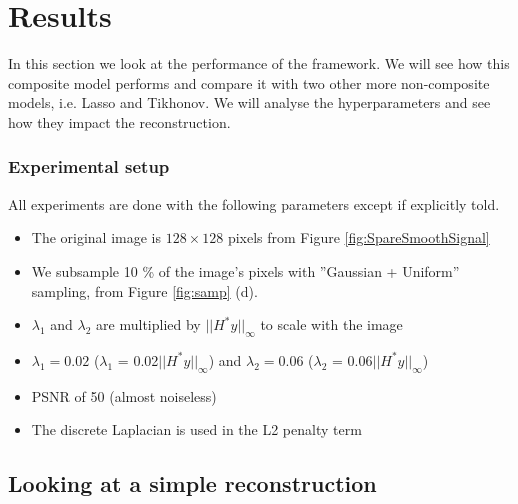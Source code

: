 \documentclass[a4paper,11pt,oneside]{report}
\theoremstyle{named}
\begin{document}
\chapter{Results} \label{Results}
In this section we look at the performance of the framework. We will see how this composite model performs and compare it with two other more non-composite models, i.e. Lasso and Tikhonov. We will analyse the hyperparameters and see how they impact the reconstruction.

\subsection{Experimental setup}
All experiments are done with the following parameters except if explicitly told.
\begin{itemize}
    \item The original image is $128 \times 128$ pixels from Figure \ref{fig:SpareSmoothSignal}
    \item  We subsample 10 \% of the image's pixels with ”Gaussian + Uniform” sampling, from Figure \ref{fig:samp} (d).
    \item $\lambda_1$ and $\lambda_2$ are multiplied by $||H^*y||_{\infty}$ to scale with the image
    \item $\lambda_1 = 0.02$ ($\lambda_1$ = 0.02$||H^*y||_{\infty}$) and $\lambda_2 = 0.06$ ($\lambda_2$ = 0.06$||H^*y||_{\infty}$)
    \item PSNR of 50 (almost noiseless)
    \item The discrete Laplacian is used in the L2 penalty term
\end{itemize}

\section{Looking at a simple reconstruction}
\end{document}

